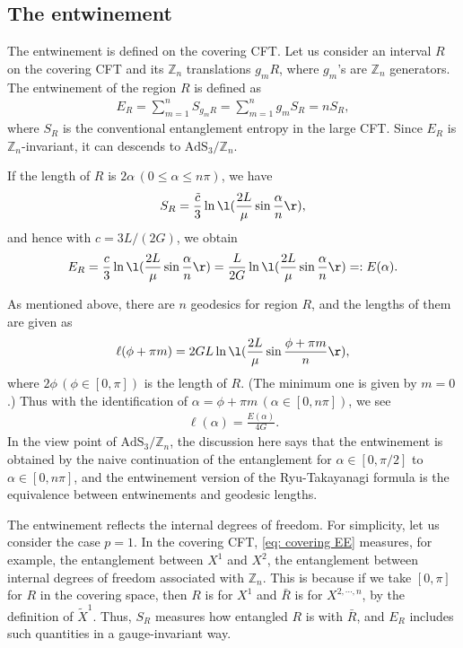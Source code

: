 \documentclass[12pt]{article}
\newcommand{\conical}[0]{\mathrm{AdS}_3/\mathbb Z_n}
\begin{document}
\subsection*{The entwinement}
The entwinement is defined on the covering CFT.
Let us consider an interval $R$ on the covering CFT and its $\mathbb Z_n$ translations $g_m R$, where $g_m$'s are $\mathbb Z_n$ generators.
The entwinement of the region $R$ is defined as
\begin{align}
	E_R = \sum_{m=1}^n S_{g_m R} = \sum_{m=1}^n g_m S_R = n S_R,
\end{align}
where $S_R$ is the conventional entanglement entropy in the large CFT.
Since $E_R$ is $\mathbb Z_n$-invariant, it can descends to $\conical$.

If the length of $R$ is $2\alpha\,(0\leq \alpha\leq n\pi)$, we have
\begin{align}
	S_R = \frac{\tilde c}{3}\ln \l(\frac{2L}{\mu} \sin \frac{\alpha}{n} \r),\label{eq: covering EE}
\end{align}
and hence with $c = 3L/(2G)$, we obtain
\begin{align}
	E_R = \frac{c}{3}\ln \l(\frac{2L}{\mu} \sin \frac{\alpha}{n} \r) 
	=  \frac{L}{2G}\ln \l(\frac{2L}{\mu} \sin \frac{\alpha}{n} \r)
	=:E(\alpha).
\end{align}

As mentioned above, there are $n$ geodesics for region $R$, and the lengths of them are given as
\begin{align}
	\ell(\phi + \pi m) = 2GL \ln \l(\frac{2L}{\mu}\sin \frac{\phi+\pi m}{n}\r),
\end{align}
where $2\phi\,(\phi\in [0,\pi])$ is the length of $R$.
(The minimum one is given by $m=0$.)
Thus with the identification of $\alpha = \phi + \pi m\,(\alpha\in [0,n\pi])$, we see
\begin{align}
	\ell(\alpha) = \frac{E(\alpha)}{4G}.
\end{align}
In the view point of $\conical$, the discussion here says that the entwinement is obtained by the naive continuation of the entanglement for $\alpha\in [0,\pi/2]$ to $\alpha \in [0,n\pi]$, and the entwinement version of the Ryu-Takayanagi formula is the equivalence between entwinements and geodesic lengths.

The entwinement reflects the internal degrees of freedom.
For simplicity, let us consider the case $p=1$.
In the covering CFT, \eqref{eq: covering EE} measures, for example, the entanglement between $X^1$ and $X^2$, the entanglement between internal degrees of freedom associated with $\mathbb Z_n$.
This is because if we take $[0,\pi]$ for $R$ in the covering space, then $R$ is for $X^1$ and $\bar R$ is for $X^{2,\cdots,n}$, by the definition of $\tilde X^1$.
Thus, $S_R$ measures how entangled $R$ is with $\bar R$, and $E_R$ includes such quantities in a gauge-invariant way.
\end{document}
